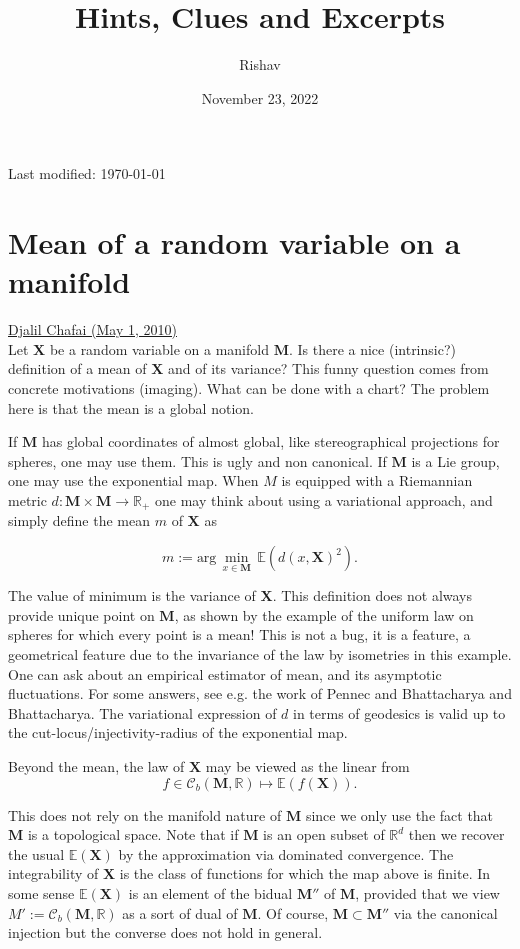 \documentclass{article}
\title{Hints, Clues and Excerpts}
\date{November 23, 2022}
\author{Rishav}
\begin{document}
\maketitle
\begin{center}
  Last modified: \today{} 
\end{center}
\tableofcontents
\newpage

\section{Mean of a random variable on a manifold}
\href{https://djalil.chafai.net/blog/2010/05/01/mean-of-random-variable-on-manifold/}{Djalil Chafai (May 1, 2010)} \\

Let $\bm{X}$ be a random variable on a manifold $\bm{M}$. Is there a nice (intrinsic?) definition of a mean of $\bm{X}$ and of its variance? This funny question comes from concrete motivations (imaging). What can be done with a chart? The problem here is that the mean is a global notion.\medskip

If $\bm{M}$ has global coordinates of almost global, like stereographical projections for spheres, one may use them. This is ugly and non canonical. If $\bm{M}$ is a Lie group, one may use the exponential map. When $M$ is equipped with a Riemannian metric $d: \bm{M}\times \bm{M} \rightarrow\mathbb{R}_{+}$ one may think about using a variational approach, and simply define the mean $m$ of $\bm{X}$ as

$$
  m:=\text{arg}\,\min\limits_{x\in\bm{M}}\, \mathbb{E}(d(x, \bm{X})^{2}).
$$

The value of minimum is the variance of $\bm{X}$. This definition does not always provide unique point on $\bm{M}$, as shown by the example of the uniform law on spheres for which every point is a mean! This is not a bug, it is a feature, a geometrical feature due to the invariance of the law by isometries in this example. One can ask about an empirical estimator of mean, and its asymptotic fluctuations. For some answers, see e.g. the work of Pennec and Bhattacharya and Bhattacharya. The variational expression of $d$ in terms of geodesics is valid up to the cut-locus/injectivity-radius of the exponential map.\medskip

Beyond the mean, the law of $\bm{X}$ may be viewed as the linear from
$$
  f \in \mathcal{C}_{b}(\bm{M}, \mathbb{R})\mapsto \mathbb{E}(f(\bm{X})).
$$

This does not rely on the manifold nature of $\bm{M}$ since we only use the fact that $\bm{M}$ is a topological space. Note that if $\bm{M}$ is an open subset of $\mathbb{R}^{d}$ then we recover the usual $\mathbb{E}(\bm{X})$ by the approximation via dominated convergence. The integrability of $\bm{X}$ is the class of functions for which the map above is finite. In some sense $\mathbb{E}(\bm{X})$ is an element of the bidual $\bm{M}''$  of $\bm{M}$, provided that we view  $M':=\mathcal{C}_{b}(\bm{M},\mathbb{R})$ as a sort of dual of $\bm{M}$. Of course, $\bm{M}\subset\bm{M}''$ via the canonical injection but the converse does not hold in general. \medskip
\end{document}
